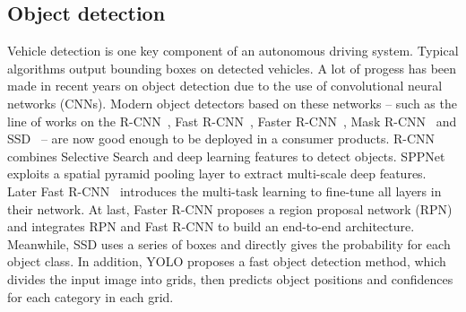 \documentclass[10pt,twocolumn,letterpaper]{article}
\begin{document}
\subsection{Object detection}
Vehicle detection is one key component of an autonomous driving system. Typical algorithms output bounding boxes on detected vehicles.
A lot of progess has been made in recent years on object detection due to the use of convolutional neural networks (CNNs).
Modern object detectors based on these networks -- such as the line of works on the R-CNN~\cite{girshick2014rich},
Fast R-CNN~\cite{Girshick2015Fast}, Faster R-CNN~\cite{ren2015faster_nips}, Mask R-CNN~\cite{he2017mask} and  SSD~\cite{liu2016ssd} -- are now good enough to be deployed in a consumer products.
 R-CNN~\cite{girshick2014rich} combines Selective Search and deep learning features to detect objects.
  SPPNet \cite{He2015Spatial} exploits a spatial pyramid pooling layer to extract multi-scale deep features. Later Fast R-CNN~\cite{Girshick2015Fast} introduces the multi-task learning to fine-tune all layers in their network. At last, Faster R-CNN \cite{ren2015faster_nips} proposes a region proposal network (RPN) and integrates RPN and Fast R-CNN to build an end-to-end architecture. Meanwhile, SSD \cite{liu2016ssd} uses a series of boxes and directly gives the probability for each object class. In addition, YOLO \cite{redmon2016you} proposes a fast object detection method, which divides the input image into grids, then predicts object positions and confidences for each category in each grid.


\end{document}
